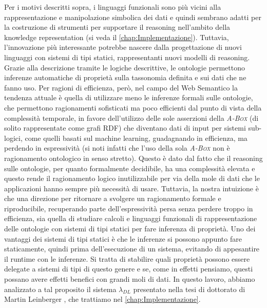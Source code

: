 Per i motivi descritti sopra, i linguaggi funzionali sono più vicini alla rappresentazione e manipolazione simbolica dei dati e quindi sembrano adatti per la costruzione di strumenti per supportare il reasoning nell'ambito della knowledge representation (si veda il \autoref{chap:Implementazione}).
Tuttavia, l'innovazione più interessante potrebbe nascere dalla progettazione di nuovi linguaggi con sistemi di tipi statici, rappresentanti nuovi modelli di reasoning. Grazie alla descrizione tramite le logiche descrittive, le ontologie permettono inferenze automatiche di proprietà sulla tassonomia definita e sui dati che ne fanno uso. Per ragioni di efficienza, però, nel campo del Web Semantico la tendenza attuale è quella di utilizzare meno le inferenze formali sulle ontologie, che permettono ragionamenti sofisticati ma poco efficienti dal punto di vista della complessità temporale, in favore dell'utilizzo delle sole asserzioni della \textsc{\itshape A-Box} (di solito rappresentate come grafi RDF) che diventano dati di input per sistemi sub-logici, come quelli basati sul machine learning, guadagnando in efficienza, ma perdendo in espressività (si noti infatti che l'uso della sola \textsc{\itshape A-Box} non è ragionamento ontologico in senso stretto). 
Questo è dato dal fatto che il reasoning sulle ontologie, per quanto formalmente decidibile, ha una complessità elevata \cite{baader2017introductionDL} e questo rende il ragionamento logico inutilizzabile per via della mole di dati che le applicazioni hanno sempre più necessità di usare. Tuttavia, la nostra intuizione è che una direzione per ritornare a svolgere un ragionamento formale e riproducibile, recuperando parte dell'espressività persa senza perdere troppo in efficienza, sia quella di studiare calcoli e linguaggi funzionali di rappresentazione delle ontologie con sistemi di tipi statici per fare inferenza di proprietà. Uno dei vantaggi dei sistemi di tipi statici è che le inferenze si possono appunto fare staticamente, quindi prima dell'esecuzione di un sistema, evitando di appesantire il runtime con le inferenze. Si tratta di stabilire quali proprietà possono essere delegate a sistemi di tipi di questo genere e se, come in effetti pensiamo, questi possano avere effetti benefici con grandi moli di dati. In questo lavoro, abbiamo analizzato a tal proposito il sistema $\lambda_{DL}$ presentato nella tesi di dottorato di Martin Leinberger \cite{leinbergerphdthesis}, che trattiamo nel \autoref{chap:Implementazione}.
